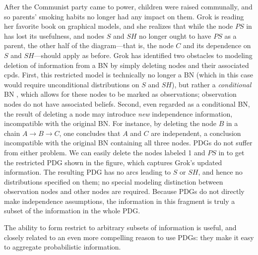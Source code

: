 \begin{example}[restriction]\label{ex:grok-ablate}
  After the Communist party came to power,
  children were raised communally, and so parents' smoking habits no longer had any impact on them. Grok is reading her favorite book on graphical models, and she realizes that while the node $\mathit{PS}$ in  has lost its usefulness, and nodes $S$ and $\mathit{SH}$ no longer ought to have $\mathit{PS}$ as a parent, the other half of the diagram---that is, the node $C$ and its dependence on $S$ and $\mathit{SH}$---should apply as before.
Grok has identified two obstacles to modeling deletion of information from a BN
by simply deleting nodes and their associated cpds. First, this restricted model
is technically no longer a BN (which in this case would require unconditional
distributions on $S$ and $\mathit{SH}$), but rather a \emph{conditional} BN
\citep{KF09}, which allows for these nodes to be marked as observations;
observation nodes do not have associated beliefs. Second, even regarded as a
conditional BN, the result of deleting a node may introduce \emph{new}
independence information, incompatible with the original BN. For instance, by
deleting the node $B$ in a chain $A \rightarrow B \rightarrow C$, one concludes
that $A$ and $C$ are independent, a conclusion incompatible with the original BN
containing all three nodes.   
PDGs do not suffer from either problem.  We can easily delete the
nodes labeled 1 and $PS$ in  to get the
restricted PDG shown in the figure, which captures Grok's updated information.
The resulting PDG has no arcs leading to $S$ or $\mathit{SH}$, and hence no
distributions specified on them; no special modeling distinction between
observation nodes and other nodes are required. Because PDGs do not directly
make independence assumptions, the information in this fragment is truly a
subset of the information in the whole PDG. 	
\end{example}

The ability to form restrict to arbitrary subsets of information is useful,
and closely related to an even more compelling reason to use PDGs:
they make it easy to aggregate probabilistic information. 
	

